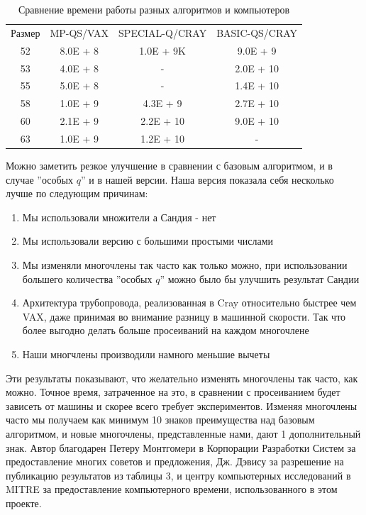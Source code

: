 \documentclass[a4paper,12pt]{report}
\begin{document}
\begin{table}[h!]
	\centering
	\begin{tabular}{ c c c c }
		Размер & MP-QS/VAX &  SPECIAL-Q/CRAY & BASIC-QS/CRAY \\
		52 & 8.0E + 8 & 1.0E + 9K & 9.0E + 9\\
		53 & 4.0E + 8 & - & 2.0E + 10\\
		55 & 5.0E + 8 & - & 1.4E + 10\\
		58 & 1.0E + 9 & 4.3E + 9 & 2.7E + 10\\
		60 & 2.1E + 9 & 2.2E + 10 & 9.0E + 10\\
		63 & 1.0E + 9 & 1.2E + 10 & -
	\end{tabular}
	\caption{Сравнение времени работы разных алгоритмов и компьютеров}
	\label{Таблица:2}
\end{table}

Можно заметить резкое улучшение в сравнении с базовым алгоритмом, и в случае ''особых $q$'' и в нашей версии. Наша версия показала себя несколько лучше по следующим причинам:

\begin{enumerate}[label=\roman*]
	\item Мы использовали множители а Сандия - нет
	\item Мы использовали версию с большими простыми числами
	\item Мы изменяли многочлены так часто как только можно, при использовании большего количества ''особых $q$'' можно было бы улучшить результат Сандии
	\item Архитектура трубопровода, реализованная в Cray относительно быстрее чем VAX, даже принимая во внимание разницу в машинной скорости. Так что более выгодно делать больше просеиваний на каждом многочлене
	\item Наши многчлены производили намного меньшие вычеты

\end{enumerate} 

Эти результаты показывают, что желательно изменять многочлены так часто, как можно. Точное время, затраченное на это, в сравнении с просеиванием будет зависеть от машины и скорее всего требует экспериментов. Изменяя многочлены часто мы получаем как минимум 10 знаков преимущества над базовым алгоритмом, и новые многочлены, представленные нами, дают 1 дополнительный знак.
Автор благодарен Петеру Монтгомери в Корпорации Разработки Систем за предоставление многих советов и предложения, Дж. Дэвису за разрешение на публикацию результатов из таблицы 3, и центру компьютерных исследований в MITRE за предоставление компьютерного времени, использованного в этом проекте.

\nocite{*}



\end{document}

